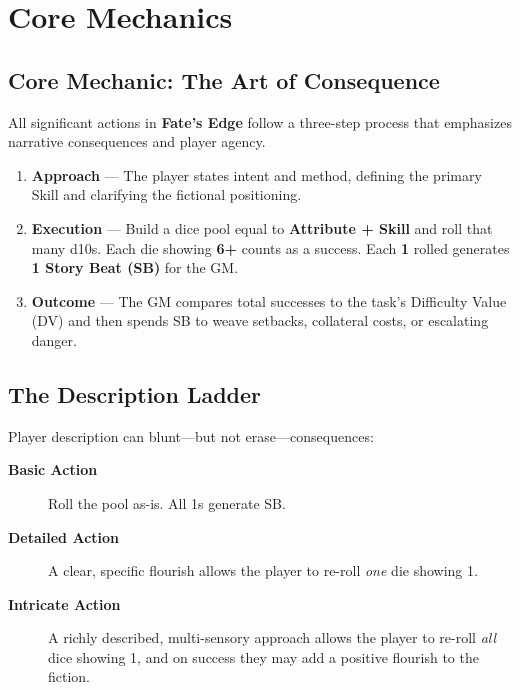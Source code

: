 \chapter{Core Mechanics}
\label{chap:core-mechanics}

\section{Core Mechanic: The Art of Consequence}
\label{sec:core-mechanic}

All significant actions in \textbf{Fate's Edge} follow a three-step process that emphasizes narrative consequences and player agency.

\begin{enumerate}
\item \textbf{Approach} — The player states intent and method, defining the primary Skill and clarifying the fictional positioning. 
\item \textbf{Execution} — Build a dice pool equal to \textbf{Attribute + Skill} and roll that many d10s. Each die showing \textbf{6+} counts as a success. Each \textbf{1} rolled generates \textbf{1 Story Beat (SB)} for the GM. 
\item \textbf{Outcome} — The GM compares total successes to the task's Difficulty Value (DV) and then spends SB to weave setbacks, collateral costs, or escalating danger. 
\end{enumerate}

\section{The Description Ladder}
\label{sec:description-ladder}

Player description can blunt—but not erase—consequences:

\begin{description}
\item[\textbf{Basic Action}] Roll the pool as-is. All 1s generate SB. 
\item[\textbf{Detailed Action}] A clear, specific flourish allows the player to re-roll \emph{one} die showing 1. 
\item[\textbf{Intricate Action}] A richly described, multi-sensory approach allows the player to re-roll \emph{all} dice showing 1, and on success they may add a positive flourish to the fiction. 
\end{description}


